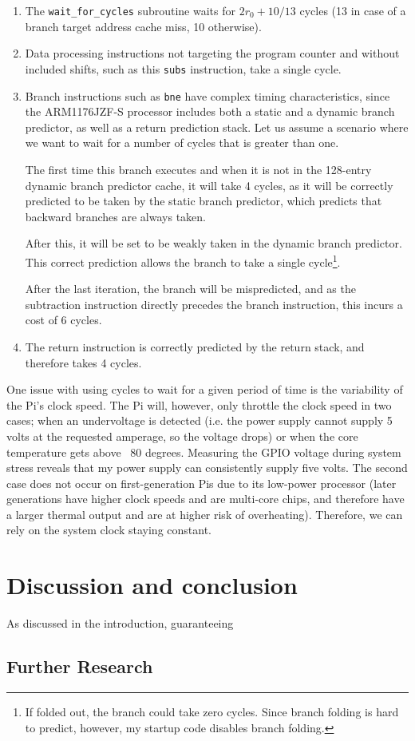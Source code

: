 \documentclass[twoside]{uva-inf-bachelor-thesis}
\newcommand{\code}[1]{\lstinline[breaklines=true]{#1}}
\begin{document}
\begin{enumerate}
    \item The \code{wait_for_cycles} subroutine waits for $2r_0 + 10/13$ cycles (13 in case of a branch target address cache miss, 10 otherwise).
    \item Data processing instructions not targeting the program counter and without included shifts, such as this \code{subs} instruction, take a single cycle\cite[p. 16-7]{arm:arm1176}.
    \item Branch instructions such as \code{bne} have complex timing characteristics, since the ARM1176JZF-S processor includes both a static and a dynamic branch predictor, as well as a return prediction stack\cite[p. 16-2]{arm:arm1176}. Let us assume a scenario where we want to wait for a number of cycles that is greater than one.

    The first time this branch executes and when it is not in the 128-entry dynamic branch predictor cache, it will take 4 cycles, as it will be correctly predicted to be taken by the static branch predictor, which predicts that backward branches are always taken\cite[p. 5-5]{arm:arm1176}.

    After this, it will be set to be weakly taken in the dynamic branch predictor. This correct prediction allows the branch to take a single cycle\footnote{If folded out, the branch could take zero cycles. Since branch folding is hard to predict, however, my startup code disables branch folding.}\cite{arm:arm1176}.

    After the last iteration, the branch will be mispredicted, and as the subtraction instruction directly precedes the branch instruction, this incurs a cost of 6 cycles.
    \item The return instruction is correctly predicted by the return stack, and therefore takes 4 cycles.
\end{enumerate}

One issue with using cycles to wait for a given period of time is the variability of the Pi's clock speed. The Pi will, however, only throttle the clock speed in two cases; when an undervoltage is detected (i.e. the power supply cannot supply 5 volts at the requested amperage, so the voltage drops) or when the core temperature gets above ~80 degrees. Measuring the GPIO voltage during system stress reveals that my power supply can consistently supply five volts. The second case does not occur on first-generation Pis due to its low-power processor (later generations have higher clock speeds and are multi-core chips, and therefore have a larger thermal output and are at higher risk of overheating). Therefore, we can rely on the system clock staying constant.


\chapter{Discussion and conclusion}
As discussed in the introduction, guaranteeing 

\section{Further Research}


{
    \hfuzz=8pt
    \printbibliography
}
\end{document}
